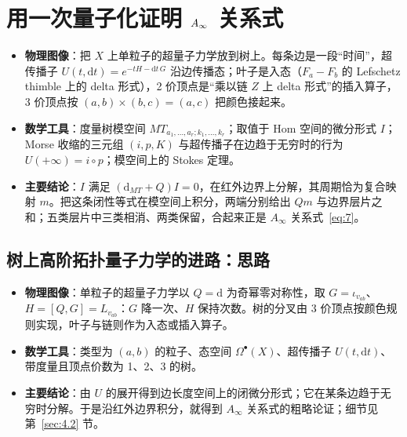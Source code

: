 \section{用一次量子化证明 $A_\infty$ 关系式}\label{sec:4}

\begin{takeaway}
\begin{itemize}
  \item \textbf{物理图像}：把 $X$ 上单粒子的超量子力学放到树上。每条边是一段“时间”，超传播子 $U(t,\mathrm{d}t)=e^{-tH-\mathrm{d}t\,G}$ 沿边传播态；叶子是入态（$F_a-F_b$ 的 Lefschetz thimble 上的 delta 形式），2 价顶点是“乘以链 $Z$ 上 delta 形式”的插入算子，3 价顶点按 $(a,b)\times(b,c)=(a,c)$ 把颜色接起来。
  \item \textbf{数学工具}：度量树模空间 $MT_{a_1,\dots,a_r;k_1,\dots,k_r}$；取值于 $\mathrm{Hom}$ 空间的微分形式 $I$；Morse 收缩的三元组 $(i,p,K)$ 与超传播子在边趋于无穷时的行为 $U(+\infty)=i\circ p$；模空间上的 Stokes 定理。
  \item \textbf{主要结论}：$I$ 满足 $(\mathrm{d}_{MT}+Q)I=0$，在红外边界上分解，其周期恰为复合映射 $m$。把这条闭性等式在模空间上积分，两端分别给出 $Qm$ 与边界层片之和；五类层片中三类相消、两类保留，合起来正是 $A_\infty$ 关系式~\eqref{eq:7}。
\end{itemize}
\end{takeaway}


\subsection{树上高阶拓扑量子力学的进路：思路}\label{sec:4.1}

\begin{takeaway}
\begin{itemize}
  \item \textbf{物理图像}：单粒子的超量子力学以 $Q=\mathrm{d}$ 为奇幂零对称性，取 $G=\iota_{v_{ab}}$、$H=[Q,G]=L_{v_{ab}}$：$G$ 降一次、$H$ 保持次数。树的分叉由 3 价顶点按颜色规则实现，叶子与链则作为入态或插入算子。
  \item \textbf{数学工具}：类型为 $(a,b)$ 的粒子、态空间 $\Omega^\bullet(X)$、超传播子 $U(t,\mathrm{d}t)$、带度量且顶点价数为 1、2、3 的树。
  \item \textbf{主要结论}：由 $U$ 的展开得到边长度空间上的闭微分形式；它在某条边趋于无穷时分解。于是沿红外边界积分，就得到 $A_\infty$ 关系式的粗略论证；细节见第~\ref{sec:4.2} 节。
\end{itemize}
\end{takeaway}

